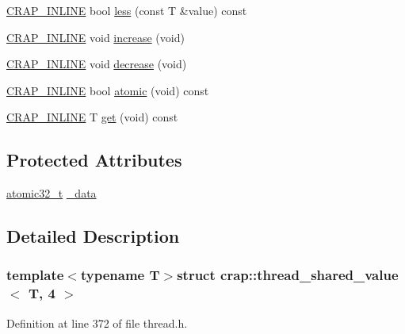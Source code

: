 \begin{DoxyCompactItemize}
\item 
\hyperlink{config__x86_8h_a5a40526b8d842e7ff731509998bb0f1c}{C\+R\+A\+P\+\_\+\+I\+N\+L\+I\+N\+E} bool \hyperlink{structcrap_1_1thread__shared__value_3_01_t_00_014_01_4_a34ccc807981fe6b2c3418ed6f8bf9a21}{less} (const T \&value) const 
\item 
\hyperlink{config__x86_8h_a5a40526b8d842e7ff731509998bb0f1c}{C\+R\+A\+P\+\_\+\+I\+N\+L\+I\+N\+E} void \hyperlink{structcrap_1_1thread__shared__value_3_01_t_00_014_01_4_a18f24e93d026f2e918eedb185266565e}{increase} (void)
\item 
\hyperlink{config__x86_8h_a5a40526b8d842e7ff731509998bb0f1c}{C\+R\+A\+P\+\_\+\+I\+N\+L\+I\+N\+E} void \hyperlink{structcrap_1_1thread__shared__value_3_01_t_00_014_01_4_a453f301fc0ba6292544d130676aa7a72}{decrease} (void)
\item 
\hyperlink{config__x86_8h_a5a40526b8d842e7ff731509998bb0f1c}{C\+R\+A\+P\+\_\+\+I\+N\+L\+I\+N\+E} bool \hyperlink{structcrap_1_1thread__shared__value_3_01_t_00_014_01_4_a8d2e439f29111facd25fc66f16545e7c}{atomic} (void) const 
\item 
\hyperlink{config__x86_8h_a5a40526b8d842e7ff731509998bb0f1c}{C\+R\+A\+P\+\_\+\+I\+N\+L\+I\+N\+E} T \hyperlink{structcrap_1_1thread__shared__value_3_01_t_00_014_01_4_af993b87290466edd83836f04203f1468}{get} (void) const 
\end{DoxyCompactItemize}
\subsection*{Protected Attributes}
\begin{DoxyCompactItemize}
\item 
\hyperlink{structcrap_1_1atomic32__t}{atomic32\+\_\+t} \hyperlink{structcrap_1_1thread__shared__value_3_01_t_00_014_01_4_a81c439b293c401c45d08b890ee5f3800}{\+\_\+data}
\end{DoxyCompactItemize}


\subsection{Detailed Description}
\subsubsection*{template$<$typename T$>$struct crap\+::thread\+\_\+shared\+\_\+value$<$ T, 4 $>$}



Definition at line 372 of file thread.\+h.



